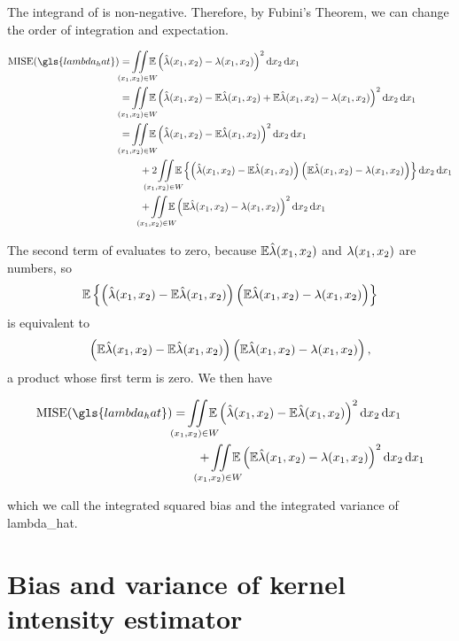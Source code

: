 The integrand of  is non-negative.
Therefore, by Fubini's Theorem, we can change the order of integration and expectation.

\begin{align}
    \mbox{MISE}(\gls{lambda_hat}) & = \iintW{ \E \left( \hat{\lambda}\xvec - \lambda\xvec \right)^2 } \nonumber \\
                & = \iintW{ \E \left( \hat{\lambda}\xvec - \E \hat{\lambda}\xvec + \E \hat{\lambda}\xvec - \lambda\xvec \right)^2 } \nonumber \\
                & = \iintW{ \E \left( \hat{\lambda}\xvec - \E \hat{\lambda}\xvec \right)^2 } \nonumber \\
                    & \qquad + 2 \iintW{
                    \E \left\{
                        \left( \hat{\lambda}\xvec - \E \hat{\lambda}\xvec \right)
                        \left( \E \hat{\lambda}\xvec - \lambda\xvec \right)
                    \right\} } \nonumber \\
                    & \qquad + \iintW{ \E \left( \E \hat{\lambda}\xvec - \lambda\xvec \right)^2 } \label{eq:mise_expanded}
\end{align}

The second term of  evaluates to zero,
because $\mathbb{E} \hat{\lambda}(x_1, x_2)$ and $\lambda(x_1, x_2)$ are numbers,
so
$$\mathbb{E} \left\{
    \left( \hat{\lambda}(x_1, x_2) - \mathbb{E} \hat{\lambda}(x_1, x_2) \right)
    \left( \mathbb{E} \hat{\lambda}(x_1, x_2) - \lambda(x_1, x_2) \right)
\right\}
$$
is equivalent to
$$ 
\left( \mathbb{E} \hat{\lambda}(x_1, x_2) - \mathbb{E} \hat{\lambda}(x_1, x_2) \right)
\left( \mathbb{E} \hat{\lambda}(x_1, x_2) - \lambda(x_1, x_2) \right) \text{,}
$$
a product whose first term is zero.
We then have 

\begin{align}
    \mbox{MISE}(\gls{lambda_hat}) & = \iintW{
        \E \left( \hat{\lambda}\xvec - \E \hat{\lambda}\xvec \right)^2 } \nonumber \\
                                  & \qquad 
        + \iintW{ \E \left( \E \hat{\lambda}\xvec - \lambda\xvec \right)^2 } \label{eq:mise_bias_variance}
\end{align}

which we call the integrated squared bias and the integrated variance of \gls{lambda_hat}.

\section{Bias and variance of kernel intensity estimator}
\label{sec:theory:bias_variance}

